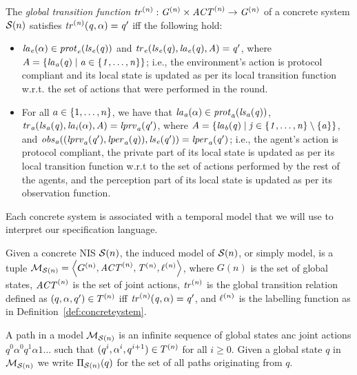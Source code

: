 \begin{definition} 
  \label{def:globaltransition}
  The {\em global transition function} $\it{tr}^{(n)} : G^{(n)}
  \times \it{ACT}^{(n)} \rightarrow G^{(n)}$ of a concrete system $\mathcal{S}(n)$
  satisfies $\it{tr}^{(n)}(q, \alpha) = q'$ iff the following hold:
  \begin{itemize}
    \item $\it{la}_{e}({\alpha}) \in \it{prot}_{e}({\it{ls}_{e}(q)})$ and $\it{tr}_{e}(\it{ls}_{e}(q),
    \it{la}_{e}({q}), A) = q'$, where $A = \left \{ \it{la}_{a}({q}) \mid a \in
    \left \{ 1,\ldots,n \right \} \right \}$; i.e., the environment’s action is protocol compliant and
    its local state is updated as per its local transition function w.r.t. the
    set of actions that were performed in the round. 

    \item For all $a \in \left \{ 1,\ldots,n \right \}$, we have that $\it{la}_{a}({\alpha}) \in
    \it{prot}_{a}(\it{ls}_{a}(q))$, $\it{tr}_{a} (\it{ls}_{a}(q), \it{la}_{i}({\alpha}), A) = \it{lprv}_{a}(q')$,
    where $A = \left \{ \it{la}_{b}({q}) \mid j \in \left \{ 1,\ldots,n \right \} \setminus \left \{ a \right \} \right \}$,
    and $\it{obs}_{a}((\it{lprv}_{a}(q'),\it{lper}_{a}(q)),\it{ls}_{e}(q')) = \it{lper}_{a}(q')$; i.e.,
    the agent's action is protocol compliant, the private part of its local
    state is updated as per its local transition function w.r.t to the set of
    actions performed by the rest of the agents, and the perception part of its
    local state is updated as per its observation function.
  \end{itemize}
\end{definition}


Each concrete system is associated with a temporal model 
that we will use  to interpret our specification language.

\begin{definition}[Model]
  Given a concrete NIS $\mathcal{S}(n)$, the induced model of $\mathcal{S}(n)$, or simply model,
  is a tuple $\mathcal{M}_{\mathcal{S}(n)} = \left \langle G^{(n)}, \it{ACT}^{(n)}, T^{(n)},
  \ell^{(n)} \right \rangle$, where $G(n)$ is the set of global states, $\it{ACT}^{(n)}$ is the
  set of joint actions, $\it{tr}^{(n)}$ is the global transition relation defined
  as $(q, \alpha, q') \in T^{(n)}$ iff $\it{tr}^{(n)}(q, \alpha) = q'$, and 
  $\ell^{(n)}$ is the labelling function as in
  Definition~\ref{def:concreteystem}.
\end{definition}

A path in a model $\mathcal{M}_{\mathcal{S}(n)}$ is an infinite sequence of global states anc joint
actions $q^0\alpha^0q^1\alpha1\ldots$ such that $(q^i,\alpha^i,q^{i+1}) \in
T^{(n)}$ for all $i \geq 0$. Given a global state $q$ in $\mathcal{M}_{\mathcal{S}(n)}$ we write
$\Pi_{\mathcal{S}(n)}(q)$ for the set of all paths originating from $q$.
  
